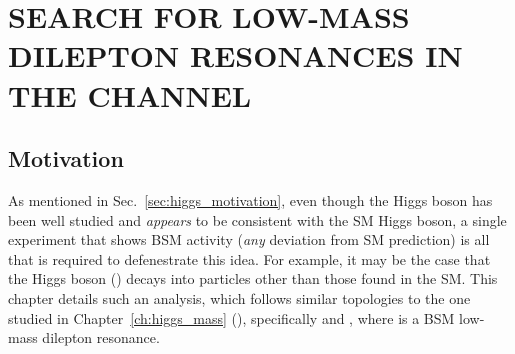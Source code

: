 \chapter{SEARCH FOR LOW-MASS DILEPTON RESONANCES IN THE \texorpdfstring{\htofourl}{H TO 4l} CHANNEL}
\label{ch:dilep_res}

\section{Motivation}
As mentioned in Sec.~\ref{sec:higgs_motivation}, even though the Higgs boson has been well studied and \emph{appears} to be consistent with the SM Higgs boson, a single experiment that shows BSM activity (\ie \emph{any} deviation from SM prediction) is all that is required to defenestrate this idea.
For example, it may be the case that the Higgs boson (\PH) decays into particles other than those found in the SM.
This chapter details such an analysis, which follows similar topologies to the one studied in Chapter~\ref{ch:higgs_mass} (\hzzfourl), specifically \hzxfourl and \hxxfourl, where \PX is a BSM low-mass dilepton resonance.